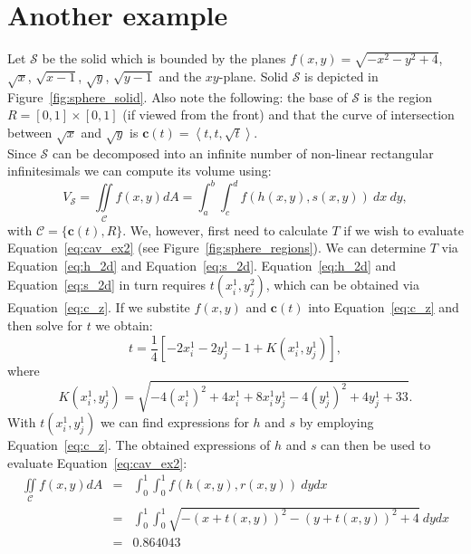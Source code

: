 \documentclass{article}
\theoremstyle{theorem}
\theoremstyle{definition}
\begin{document}

\section{Another example}
Let $\mathcal{S}$ be the solid which is bounded by the planes $f(x,y)=\sqrt{-x^2-y^2+4}$, $\sqrt{x}$, $\sqrt{x-1}$, $\sqrt{y}$, $\sqrt{y-1}$ and the $xy$-plane. Solid $\mathcal{S}$ is depicted 
in Figure~\ref{fig:sphere_solid}. Also note the following: the base of $\mathcal{S}$ is the region 
$R = [0,1]\times [0,1]$ (if viewed from the front) and that the curve of intersection between $\sqrt{x}$ and $\sqrt{y}$ is $\mathbf{c}(t) = \left < t,t,\sqrt{t}\right >$. \\

\noindent
Since $\mathcal{S}$ can be decomposed into an infinite number of non-linear rectangular infinitesimals we can compute its volume using:
\begin{equation}
\label{eq:cav_ex2}
V_{\mathcal{S}} = \iint\limits_{\!\mathcal{C}} f(x,y) dA =  \int_a^b\int_c^d f(h(x,y),s(x,y))~dx~dy,
\end{equation}
with $\mathcal{C}=\{\mathbf{c}(t),R\}$. We, however, first need to calculate $T$ if we wish to evaluate Equation~\ref{eq:cav_ex2} (see Figure~\ref{fig:sphere_regions}). We can determine $T$ via 
Equation~\eqref{eq:h_2d} and Equation~\eqref{eq:s_2d}. Equation~\eqref{eq:h_2d} and Equation~\eqref{eq:s_2d} in turn requires $t(x_i^1,y_j^2)$, which can be obtained via Equation~\eqref{eq:c_z}.
If we substite $f(x,y)$ and $\mathbf{c}(t)$ into Equation~\eqref{eq:c_z} and then solve for $t$ we obtain:
\begin{equation}
t = \frac{1}{4}[-2 x_{i}^1 - 2 y_{j}^1  -  1 + K(x_{i}^1,y_{j}^1)],
\end{equation}
where
\begin{equation}
K(x_{i}^1,y_{j}^1) = \sqrt{-4(x_{i}^1)^2+4x_{i}^1+8x_{i}^1y_{j}^1-4(y_{j}^1)^2+4y_{j}^1 + 33}. 
\end{equation}
With $t(x_i^1,y_j^1)$ we can find expressions for $h$ and $s$ by employing Equation~\eqref{eq:c_z}. The obtained expressions of $h$ and $s$ can then be used to evaluate Equation~\eqref{eq:cav_ex2}:  
\begin{eqnarray}
\iint\limits_{\!\mathcal{C}} f(x,y) dA &=& \int_0^1\int_0^1 f(h(x,y),r(x,y))~dydx\\
&=& \int_0^1 \int_0^1 \sqrt{-(x+t(x,y))^2 - (y+t(x,y))^2 + 4} ~dydx\\
&=& 0.864043
\end{eqnarray}
\end{document}
